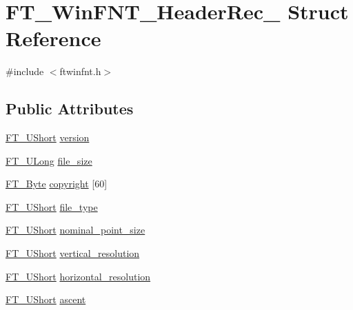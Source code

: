 \hypertarget{struct_f_t___win_f_n_t___header_rec__}{}\section{F\+T\+\_\+\+Win\+F\+N\+T\+\_\+\+Header\+Rec\+\_\+ Struct Reference}
\label{struct_f_t___win_f_n_t___header_rec__}


{\ttfamily \#include $<$ftwinfnt.\+h$>$}

\subsection*{Public Attributes}
\begin{DoxyCompactItemize}
\item 
\mbox{\hyperlink{fttypes_8h_a937f6c17cf5ffd09086d8610c37b9f58}{F\+T\+\_\+\+U\+Short}} \mbox{\hyperlink{struct_f_t___win_f_n_t___header_rec___a88f8539fc11d2fac60f172553caa5b8d}{version}}
\item 
\mbox{\hyperlink{fttypes_8h_a4fac88bdba78eb76b505efa6e4fbf3f5}{F\+T\+\_\+\+U\+Long}} \mbox{\hyperlink{struct_f_t___win_f_n_t___header_rec___ae311838f941463d96f4ee570de58a359}{file\+\_\+size}}
\item 
\mbox{\hyperlink{fttypes_8h_a51f26183ca0c9f4af958939648caeccd}{F\+T\+\_\+\+Byte}} \mbox{\hyperlink{struct_f_t___win_f_n_t___header_rec___a289a835480eac30710dae8bfc04c6ae7}{copyright}} \mbox{[}60\mbox{]}
\item 
\mbox{\hyperlink{fttypes_8h_a937f6c17cf5ffd09086d8610c37b9f58}{F\+T\+\_\+\+U\+Short}} \mbox{\hyperlink{struct_f_t___win_f_n_t___header_rec___a0ca7a317967750673fd06f98af5f8329}{file\+\_\+type}}
\item 
\mbox{\hyperlink{fttypes_8h_a937f6c17cf5ffd09086d8610c37b9f58}{F\+T\+\_\+\+U\+Short}} \mbox{\hyperlink{struct_f_t___win_f_n_t___header_rec___a98fd9a9f31cdbdfa570fba3e0094dfdc}{nominal\+\_\+point\+\_\+size}}
\item 
\mbox{\hyperlink{fttypes_8h_a937f6c17cf5ffd09086d8610c37b9f58}{F\+T\+\_\+\+U\+Short}} \mbox{\hyperlink{struct_f_t___win_f_n_t___header_rec___ad8f76384c2eec492a559e66de170baba}{vertical\+\_\+resolution}}
\item 
\mbox{\hyperlink{fttypes_8h_a937f6c17cf5ffd09086d8610c37b9f58}{F\+T\+\_\+\+U\+Short}} \mbox{\hyperlink{struct_f_t___win_f_n_t___header_rec___a0adc07f0f285c8c2350c0078d71ace9a}{horizontal\+\_\+resolution}}
\item 
\mbox{\hyperlink{fttypes_8h_a937f6c17cf5ffd09086d8610c37b9f58}{F\+T\+\_\+\+U\+Short}} \mbox{\hyperlink{struct_f_t___win_f_n_t___header_rec___a99125a3ce627cd8295c50c6019ec2f42}{ascent}}

\end{DoxyCompactItemize}
